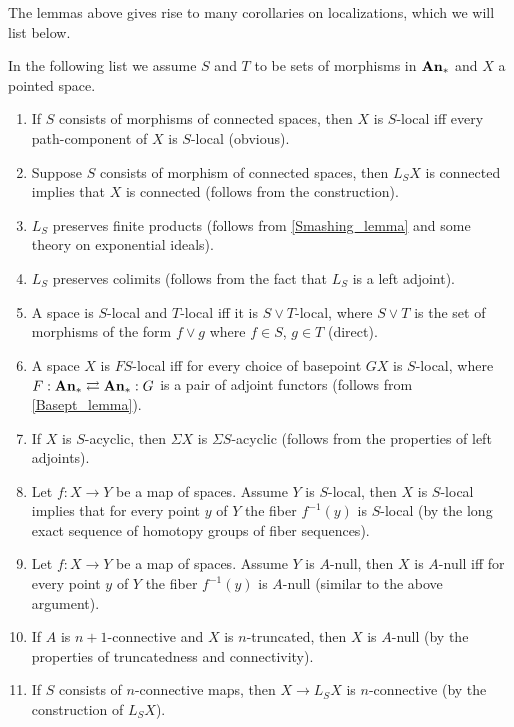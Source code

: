 	The lemmas above gives rise to many corollaries on localizations, which we will list below. 

	\begin{thm}\label{Elementary_prop_loc}
		In the following list we assume $S$ and $T$ to be sets of morphisms in $\mathbf{An}_*$ and $X$ a pointed space. 
		\begin{enumerate}
			\item If $S$ consists of morphisms of connected spaces, then $X$ is $S$-local iff every path-component of $X$ is $S$-local (obvious). 
			\item Suppose $S$ consists of morphism of connected spaces, then $L_SX$ is connected implies that $X$ is connected (follows from the construction). 
			\item $L_S$ preserves finite products (follows from \cref{Smashing_lemma} and some theory on exponential ideals). 
			\item $L_S$ preserves colimits (follows from the fact that $L_S$ is a left adjoint). 
			\item A space is $S$-local and $T$-local iff it is $S\vee T$-local, where $S\vee T$ is the set of morphisms of the form $f\vee g$ where $f\in S$, $g\in T$ (direct). 
			\item A space $X$ is $FS$-local iff for every choice of basepoint $GX$ is $S$-local, where $F:\mathbf{An}_*\rightleftarrows\mathbf{An}_*:G$ is a pair of adjoint functors (follows from \cref{Basept_lemma}). 
			\item If $X$ is $S$-acyclic, then $\Sigma X$ is $\Sigma S$-acyclic (follows from the properties of left adjoints).
			\item Let $f:X\to Y$ be a map of spaces. Assume $Y$ is $S$-local, then $X$ is $S$-local implies that for every point $y$ of $Y$ the fiber $f^{-1}(y)$ is $S$-local (by the long exact sequence of homotopy groups of fiber sequences). 
			\item Let $f:X\to Y$ be a map of spaces. Assume $Y$ is $A$-null, then $X$ is $A$-null iff for every point $y$ of $Y$ the fiber $f^{-1}(y)$ is $A$-null (similar to the above argument). 
			\item If $A$ is $n+1$-connective and $X$ is $n$-truncated, then $X$ is $A$-null (by the properties of truncatedness and connectivity). 
			\item If $S$ consists of $n$-connective maps, then $X\to L_SX$ is $n$-connective (by the construction of $L_SX$). 
		\end{enumerate}
	\end{thm}

